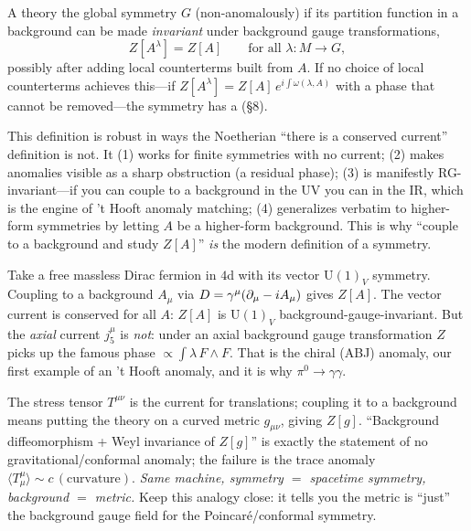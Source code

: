 \documentclass[11pt]{article}
\newcommand{\Uone}{\mathrm{U}(1)}
\begin{document}
\begin{ddefinition}
A theory  the global symmetry $G$ (non-anomalously) if its partition
function in a background can be made \emph{invariant} under background gauge
transformations,
\[
Z[A^\lambda] = Z[A]\qquad\text{for all }\lambda:M\to G,
\]
possibly after adding local counterterms built from $A$. If no choice of local
counterterms achieves this---if $Z[A^\lambda]=Z[A]\,e^{i\int \omega(\lambda,A)}$ with a
phase that cannot be removed---the symmetry has a  (\S8).
\end{ddefinition}

\begin{iintuition}
This definition is robust in ways the Noetherian ``there is a conserved current''
definition is not. It (1) works for finite symmetries with no current; (2) makes
anomalies visible as a sharp obstruction (a residual phase); (3) is manifestly
RG-invariant---if you can couple to a background in the UV you can in the IR, which is
the engine of 't Hooft anomaly matching; (4) generalizes verbatim to higher-form
symmetries by letting $A$ be a higher-form background. This is why ``couple to a
background and study $Z[A]$'' \emph{is} the modern definition of a symmetry.
\end{iintuition}

\begin{eexample}[Free Dirac fermion in a background $\Uone$]
Take a free massless Dirac fermion in $4$d with its vector $\Uone_V$ symmetry. Coupling
to a background $A_\mu$ via $\sl{D} = \gamma^\mu(\partial_\mu - iA_\mu)$ gives
$Z[A]$. The vector current is conserved for all $A$: $Z[A]$ is $\Uone_V$
background-gauge-invariant. But the \emph{axial} current $j_5^\mu$ is \emph{not}: under
an axial background gauge transformation $Z$ picks up the famous phase
$\propto \int \lambda\, F\wedge F$. That is the chiral (ABJ) anomaly, our first example
of an 't Hooft anomaly, and it is why $\pi^0\to\gamma\gamma$.
\end{eexample}

\begin{eexample}
The stress tensor $T^{\mu\nu}$ is the current for translations; coupling it to a
background means putting the theory on a curved metric $g_{\mu\nu}$, giving $Z[g]$.
``Background diffeomorphism + Weyl invariance of $Z[g]$'' is exactly the statement of no
gravitational/conformal anomaly; the failure is the trace anomaly
$\langle T^\mu_\mu\rangle\sim c\,(\text{curvature})$. \emph{Same machine, symmetry
$=$ spacetime symmetry, background $=$ metric.} Keep this analogy close: it tells you
the metric is ``just'' the background gauge field for the Poincar\'e/conformal symmetry.
\end{eexample}
\end{document}
